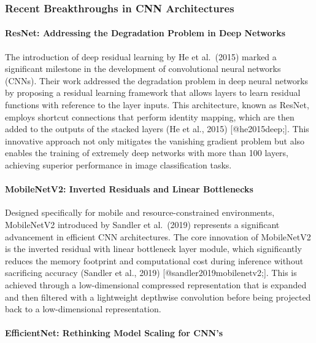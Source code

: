 \documentclass{article}
\begin{document}
\subsubsection{Recent Breakthroughs in CNN
Architectures}\label{recent-breakthroughs-in-cnn-architectures}

\paragraph{ResNet: Addressing the Degradation Problem in Deep
Networks}\label{resnet-addressing-the-degradation-problem-in-deep-networks}

The introduction of deep residual learning by He et al.~(2015) marked a
significant milestone in the development of convolutional neural
networks (CNNs). Their work addressed the degradation problem in deep
neural networks by proposing a residual learning framework that allows
layers to learn residual functions with reference to the layer inputs.
This architecture, known as ResNet, employs shortcut connections that
perform identity mapping, which are then added to the outputs of the
stacked layers (He et al., 2015) {[}@he2015deep;{]}. This innovative
approach not only mitigates the vanishing gradient problem but also
enables the training of extremely deep networks with more than 100
layers, achieving superior performance in image classification tasks.

\paragraph{MobileNetV2: Inverted Residuals and Linear
Bottlenecks}\label{mobilenetv2-inverted-residuals-and-linear-bottlenecks}

Designed specifically for mobile and resource-constrained environments,
MobileNetV2 introduced by Sandler et al.~(2019) represents a significant
advancement in efficient CNN architectures. The core innovation of
MobileNetV2 is the inverted residual with linear bottleneck layer
module, which significantly reduces the memory footprint and
computational cost during inference without sacrificing accuracy
(Sandler et al., 2019) {[}@sandler2019mobilenetv2;{]}. This is achieved
through a low-dimensional compressed representation that is expanded and
then filtered with a lightweight depthwise convolution before being
projected back to a low-dimensional representation.

\paragraph{EfficientNet: Rethinking Model Scaling for
CNN's}\label{efficientnet-rethinking-model-scaling-for-cnns}
\end{document}
